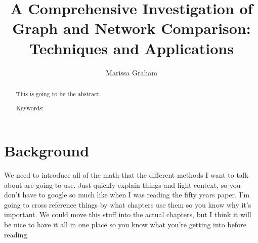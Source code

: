 \documentclass[12pt]{thesis}
\author{Marissa Graham}
\title{A Comprehensive Investigation of Graph and Network Comparison: Techniques and Applications}
\theoremstyle{plain}
\theoremstyle{definition}
\theoremstyle{remark}
\begin{document}

\frontmatter 
\maketitle 

\begin{abstract}
This is going to be the abstract.		
\vskip 3.25in
 
\noindent Keywords: %
\end{abstract}


\tableofcontents
\listoftables
\listoffigures
\mainmatter







\chapter{Background}

We need to introduce all of the math that the different methods I want to talk about are going to use. Just quickly explain things and light context, so you don't have to google so much like when I was reading the fifty years paper. I'm going to cross reference things by what chapters use them so you know why it's important. We could move this stuff into the actual chapters, but I think it will be nice to have it all in one place so you know what you're getting into before reading.
\end{document}
